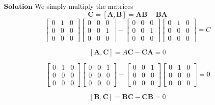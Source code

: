 $\boxed{\textbf{Solution}}$ We simply multiply the matrices
$$\mathbf{C}=[\mathbf{A}, \mathbf{B}] = \mathbf{\mathbf{AB}}- \mathbf{BA}$$
$$\begin{bmatrix}{0} & {1} & {0} \\ {0} & {0} & {0} \\ {0} & {0} & {0}\end{bmatrix} \begin{bmatrix}{0} & {0} & {0} \\ {0} & {0} & {1} \\ {0} & {0} & {0}\end{bmatrix} - \begin{bmatrix}{0} & {0} & {0} \\ {0} & {0} & {1} \\ {0} & {0} & {0}\end{bmatrix}\begin{bmatrix}{0} & {1} & {0} \\ {0} & {0} & {0} \\ {0} & {0} & {0}\end{bmatrix} = C$$

$$[\mathbf{A}, \mathbf{C}] = A\mathbf{C}-\mathbf{C}\mathbf{A} = 0$$

$$\begin{bmatrix}{0} & {1} & {0} \\ {0} & {0} & {0} \\ {0} & {0} & {0}\end{bmatrix} \begin{bmatrix}{0} & {0} & {1} \\ {0} & {0} & {0} \\ {0} & {0} & {0}\end{bmatrix}- \begin{bmatrix}{0} & {0} & {1} \\ {0} & {0} & {0} \\ {0} & {0} & {0}\end{bmatrix}\begin{bmatrix}{0} & {1} & {0} \\ {0} & {0} & {0} \\ {0} & {0} & {0}\end{bmatrix} = 0$$

$$[\mathbf{B}, \mathbf{C}] = \mathbf{BC}-\mathbf{C}\mathbf{B} = 0$$

